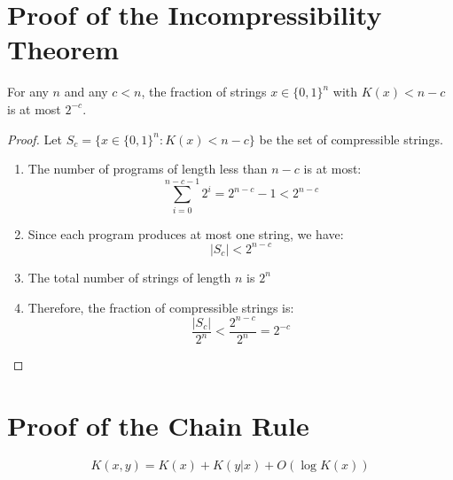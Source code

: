 \documentclass[12pt,a4paper]{report}
\begin{document}
\section{Proof of the Incompressibility Theorem}

\begin{theorem}
For any $n$ and any $c < n$, the fraction of strings $x \in \{0,1\}^n$ with $K(x) < n - c$ is at most $2^{-c}$.
\end{theorem}

\begin{proof}
Let $S_c = \{x \in \{0,1\}^n : K(x) < n - c\}$ be the set of compressible strings.

\begin{enumerate}
    \item The number of programs of length less than $n - c$ is at most:
    \begin{equation}
    \sum_{i=0}^{n-c-1} 2^i = 2^{n-c} - 1 < 2^{n-c}
    \end{equation}

    \item Since each program produces at most one string, we have:
    \begin{equation}
    |S_c| < 2^{n-c}
    \end{equation}

    \item The total number of strings of length $n$ is $2^n$

    \item Therefore, the fraction of compressible strings is:
    \begin{equation}
    \frac{|S_c|}{2^n} < \frac{2^{n-c}}{2^n} = 2^{-c}
    \end{equation}
\end{enumerate}
\end{proof}

\section{Proof of the Chain Rule}

\begin{theorem}
\begin{equation}
K(x, y) = K(x) + K(y|x) + O(\log K(x))
\end{equation}
\end{theorem}
\end{document}
